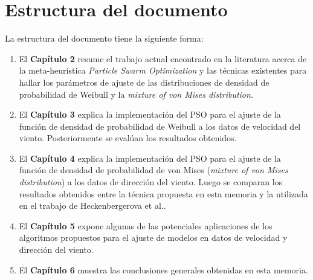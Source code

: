 \section{Estructura del documento}
La estructura del documento tiene la siguiente forma:
\begin{enumerate}
  \item El \textbf{Capítulo 2} resume el trabajo actual encontrado en la literatura acerca de la meta-heurística \emph{Particle Swarm Optimization} y las técnicas existentes para hallar los parámetros de ajuste de las distribuciones de densidad de probabilidad de Weibull y la \emph{mixture of von Mises distribution}.
  \item El \textbf{Capítulo 3} explica la implementación del PSO para el ajuste de la función de densidad de probabilidad de Weibull a los datos de velocidad del viento. Posteriormente se evalúan los resultados obtenidos.
  \item El \textbf{Capítulo 4} explica la implementación del PSO para el ajuste de la función de densidad de probabilidad de von Mises (\emph{mixture of von Mises distribution}) a los datos de dirección del viento. Luego se comparan los resultados obtenidos entre la técnica propuesta en esta memoria y la utilizada en el trabajo de Heckenbergerova et al.\cite{Heckenbergerova15}.
  \item El \textbf{Capítulo 5} expone algunas de las potenciales aplicaciones de los algoritmos propuestos para el ajuste de modelos en datos de velocidad y dirección del viento.
  \item El \textbf{Capítulo 6} muestra las conclusiones generales obtenidas en esta memoria. 
\end{enumerate}